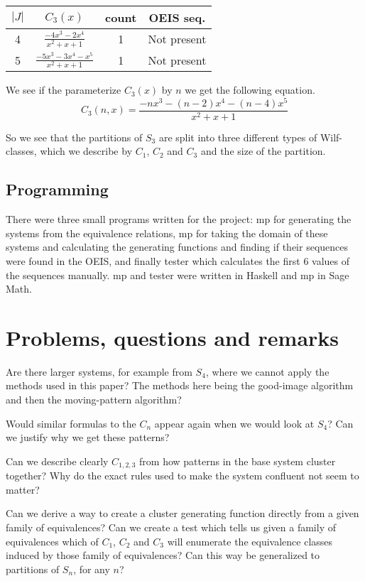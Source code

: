 \documentclass[a4paper, 11pt, english]{article}
\theoremstyle{definition}
\newcommand{\Sym}{S}
\begin{document}
\begin{center}
\begin{tabular}{c|c|c|c}
    $|J|$ & $C_3(x)$ & count & OEIS seq. \\
    \hline
    4 & $\frac{-4x^3-2x^4}{x^2+x+1}$ & 1 & Not present \\ 
    5 & $\frac{-5x^3-3x^4-x^5}{x^2+x+1}$ & 1 & Not present\\
\end{tabular}
\end{center}
We see if the parameterize $C_3(x)$ by $n$ we get the following equation.
\[
    C_3(n,x) = \frac{-nx^3-(n-2)x^4-(n-4)x^5}{x^2+x+1}
\]

So we see that the partitions of $\Sym_3$ are split into three different types
of Wilf-classes, which we describe by $C_1$, $C_2$ and $C_3$ and the size
of the partition.

\subsection{Programming}
There were three small programs written for the project: mp for generating the
systems from the equivalence relations, mp for taking the domain of these
systems and calculating the generating functions and finding if their sequences
were found in the OEIS, and finally tester which calculates the first 6 values
of the sequences manually. mp and tester were written in Haskell and mp in Sage Math. 


\section{Problems, questions and remarks}
Are there larger systems, for example from $\Sym_4$, where we cannot apply the
methods used in this paper? The methods here being the good-image algorithm and
then the moving-pattern algorithm?

Would similar formulas to the $C_n$ appear again when we would
look at $\Sym_4$? Can we justify why we get these patterns?

Can we describe clearly $C_{1,2,3}$ from how patterns in the base system cluster together?
Why do the exact rules used to make the system confluent not seem to matter?

Can we derive a way to create a cluster generating function directly from a
given family of equivalences? Can we create a test which tells us given a family
of equivalences which of $C_1$, $C_2$ and $C_3$ will enumerate the equivalence
classes induced by those family of equivalences?
Can this way be generalized to partitions of $\Sym_n$, for any $n$?
\end{document}
